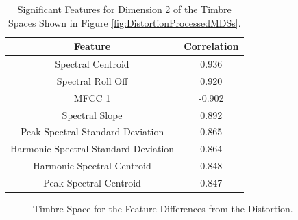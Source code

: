 		\begin{table}[h!]
			\centering
			\begin{tabular}{|c|c|}
				\hline
				\bf{Feature} & \bf{Correlation} \\
				\hline
				\hline
				Spectral Centroid &  0.936 \\
				\hline
				Spectral Roll Off &  0.920 \\
				\hline
				MFCC 1 & -0.902 \\
				\hline
				Spectral Slope &  0.892 \\
				\hline
				Peak Spectral Standard Deviation &  0.865 \\
				\hline
				Harmonic Spectral Standard Deviation &  0.864 \\
				\hline
				Harmonic Spectral Centroid &  0.848 \\
				\hline
				Peak Spectral Centroid &  0.847 \\
				\hline
			\end{tabular}
			\caption{Significant Features for Dimension 2 of the Timbre Spaces Shown in Figure 
				 \ref{fig:DistortionProcessedMDSs}.}
			\label{tab:DistortionProcessedFeaturesDim2}
		\end{table}

		\begin{figure}[h!]
			\centering
			\qquad
			\caption{Timbre Space for the Feature Differences from the Distortion.}
			\label{fig:DistortionDifferenceMDSs}
		\end{figure}

